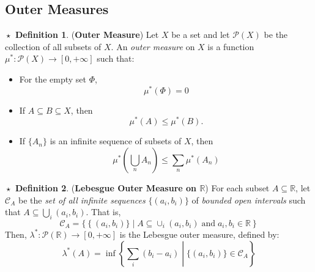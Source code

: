 \documentclass{article}
\theoremstyle{definition}
\newtheorem{definition}{$\boxed{\star}$ Definition}
\theoremstyle{remark}
\theoremstyle{definition}
\theoremstyle{definition}
\theoremstyle{definition}
\newcommand{\union}{\cup}
\newcommand{\bunion}{\bigcup}
\newcommand{\where}{\;\vert\;}
\newcommand{\R}{\mathbb{R}}
\newcommand{\alg}[1]{\mathscr{#1}}
\newcommand{\pow}[1]{\mathscr{P}\left (#1\right )}
\newcommand{\om}[1]{\mu^*\left ( #1\right )}
\newcommand{\lom}[1]{\lambda^*\left (#1\right )}
\begin{document}
\subsection{Outer Measures}
\begin{definition}
	(\textbf{Outer Measure}) Let $ X $ be a set and let $  \pow{X} $ be the collection of all subsets of $ X $. An \emph{outer measure} on $ X $ is a function $ \mu^* : \pow{X} \longrightarrow [0,+\infty] $ such that:
	\begin{itemize}
		\item {For the empty set $ \Phi $,
	\[\om{\Phi} = 0\]	
	}
		\item {If $ A\subseteq B\subseteq X $, then
	\[\om{A}\le \om{B}.\]	
	}
\item {If $ \{A_n\} $ is an infinite sequence of subsets of $ X $, then
\[\om{\bunion_n A_n} \le \sum_n \om{A_n}\]
}
	\end{itemize}
\end{definition}
\hrulefill
\begin{definition}
	(\textbf{Lebesgue Outer Measure on $ \R $}) For each subset $ A\subseteq \R $, let $ \alg{C}_A $ be the \emph{set of all infinite sequences} $ \{(a_i,b_i)\} $ of \emph{bounded open intervals} such that $ A\subseteq \bunion_i (a_i,b_i) $. That is, 
	\[\alg{C}_A = \{\left \{(a_i,b_i)\}\where A\subseteq \union_i (a_i,b_i)\;\text{and}\;a_i,b_i\in \R\right \}\]
	Then, $ \lambda^* : \pow{\R}\longrightarrow [0,+\infty]$ is the Lebesgue outer measure, defined by:
	\begin{equation}
		\lom{A} = \inf \left \{\left .\sum_{i} (b_i - a_i)\;\right \vert\;\{(a_i,b_i)\}\in \alg{C}_A \right \}
	\end{equation} 
\end{definition}
\hrulefill
\end{document}
